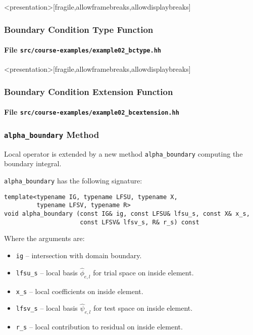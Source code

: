 \begin{frame}<presentation>[fragile,allowframebreaks,allowdisplaybreaks]
\frametitle<presentation>{Boundary Condition Type Function}
\framesubtitle<presentation>{File \texttt{src/course-examples/example02\_bctype.hh}}

\end{frame}

\begin{frame}<presentation>[fragile,allowframebreaks,allowdisplaybreaks]
\frametitle<presentation>{Boundary Condition Extension Function}
\framesubtitle<presentation>{File \texttt{src/course-examples/example02\_bcextension.hh}}

\end{frame}

\begin{frame}[fragile]
\frametitle{\lstinline{alpha_boundary} Method}
Local operator is extended by a new method \lstinline{alpha_boundary}
computing the boundary integral.

\lstinline{alpha_boundary} has the following signature:
\begin{lstlisting}[basicstyle=\scriptsize]
template<typename IG, typename LFSU, typename X,
         typename LFSV, typename R>
void alpha_boundary (const IG& ig, const LFSU& lfsu_s, const X& x_s,
                     const LFSV& lfsv_s, R& r_s) const
\end{lstlisting}
Where the arguments are:
\begin{itemize}
\item \lstinline{ig} -- intersection with domain boundary.
\item \lstinline{lfsu_s} -- local basis $\hat\phi_{e,l}$ for trial space on inside element.
\item \lstinline{x_s} -- local coefficients on inside element.
\item \lstinline{lfsv_s} -- local basis $\hat\psi_{e,l}$ for test space on inside element.
\item \lstinline{r_s} -- local contribution to residual on inside element.
\end{itemize}
\end{frame}


